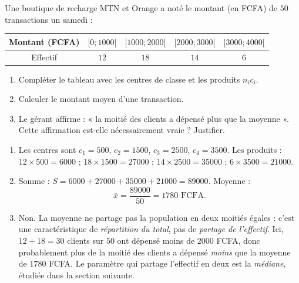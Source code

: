 \documentclass[11pt]{article}
\begin{document}
\begin{exercice}
Une boutique de recharge MTN et Orange a noté le montant (en FCFA) de $50$ transactions un samedi :
\begin{center}
\begin{tabular}{|c|cccc|}
\hline
\rowcolor{popblueL} Montant (FCFA) & $[0;1000[$ & $[1000;2000[$ & $[2000;3000[$ & $[3000;4000[$ \\
\hline Effectif & $12$ & $18$ & $14$ & $6$ \\
\hline
\end{tabular}
\end{center}
\begin{enumerate}
\item Compléter le tableau avec les centres de classe et les produits $n_ic_i$.
\item Calculer le montant moyen d'une transaction.
\item Le gérant affirme : « la moitié des clients a dépensé plus que la moyenne ». Cette affirmation est-elle nécessairement vraie ? Justifier.
\end{enumerate}
\end{exercice}

\begin{corrige}
\begin{enumerate}
\item Les centres sont $c_1=500$, $c_2=1500$, $c_3=2500$, $c_4=3500$. Les produits : $12\times 500=6000$ ; $18\times 1500=27000$ ; $14\times 2500=35000$ ; $6\times 3500=21000$.
\item Somme : $S=6000+27000+35000+21000=89000$. Moyenne :
\[
\bar{x}=\frac{89000}{50}=1780 \text{ FCFA}.
\]
\item Non. La moyenne ne partage pas la population en deux moitiés égales : c'est une caractéristique de \emph{répartition du total}, pas de \emph{partage de l'effectif}. Ici, $12+18=30$ clients sur $50$ ont dépensé moins de $2000$ FCFA, donc probablement plus de la moitié des clients a dépensé \emph{moins} que la moyenne de $1780$ FCFA. Le paramètre qui partage l'effectif en deux est la \emph{médiane}, étudiée dans la section suivante.
\end{enumerate}
\end{corrige}
\end{document}
